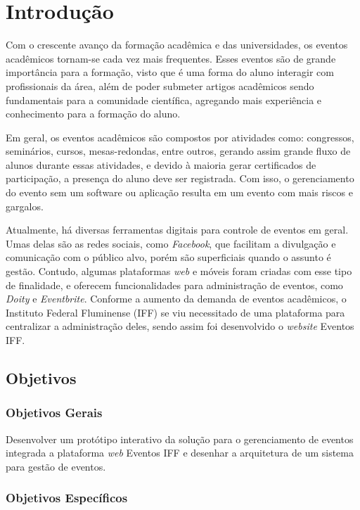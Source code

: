 \chapter{Introdução}

Com o crescente avanço da formação acadêmica e das universidades, os eventos acadêmicos tornam-se cada vez mais frequentes. Esses eventos são de grande importância para a formação, visto que é uma forma do aluno interagir com profissionais da área, além de poder submeter artigos acadêmicos sendo fundamentais para a comunidade científica, agregando mais experiência e conhecimento para a formação do aluno.

Em geral, os eventos acadêmicos são compostos por atividades como: congressos, seminários, cursos, mesas-redondas, entre outros, gerando assim grande fluxo de alunos durante essas atividades, e devido à maioria gerar certificados de participação, a presença do aluno deve ser registrada. Com isso, o gerenciamento do evento sem um software ou aplicação resulta em um evento com mais riscos e gargalos. 

Atualmente, há diversas ferramentas digitais para controle de eventos em geral. Umas delas são as redes sociais, como \textit{Facebook}, que facilitam a divulgação e comunicação com o público alvo, porém são superficiais quando o assunto é gestão. Contudo, algumas plataformas \textit{web} e móveis foram criadas com esse tipo de finalidade, e oferecem funcionalidades para administração de eventos, como \textit{Doity} e \textit{Eventbrite}. 
Conforme a aumento da demanda de eventos acadêmicos, o Instituto Federal Fluminense (IFF) se viu necessitado de uma plataforma para centralizar a administração deles, sendo assim foi desenvolvido o \textit{website} Eventos IFF.

\section{Objetivos}
\subsection{Objetivos Gerais}

Desenvolver um protótipo interativo da solução para o gerenciamento de eventos integrada a plataforma \textit{web} Eventos IFF e desenhar a arquitetura de um sistema para gestão de eventos.

\subsection{Objetivos Específicos}

